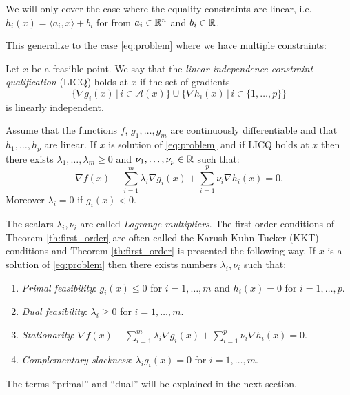 \documentclass[11pt,nocut]{article}
\begin{document}
We will only cover the case where the equality constraints are linear, i.e. $h_i(x) = \langle a_i, x \rangle + b_i$ for from $a_i \in \mathbb{R}^n$ and $b_i \in \mathbb{R}$.

This generalize to the case \eqref{eq:problem} where we have multiple constraints:

\begin{definition}[LICQ]
	Let $x$ be a feasible point. We say that the \emph{linear independence constraint qualification} (LICQ) holds at $x$ if the set of gradients
	$$
	\big\{ \nabla g_i(x) \, \big| \, i \in \mathcal{A}(x) \big\}
	\cup
	\big\{ \nabla h_i(x) \, \big| \, i \in \{1, \dots, p\} \big\}
	$$
	is linearly independent.
\end{definition}

\begin{theorem}\label{th:first_order}
	Assume that the functions $f$, $g_1, \dots, g_m$ are continuously differentiable and that $h_1, \dots, h_p$ are linear. If $x$ is solution of \eqref{eq:problem} and if LICQ holds at $x$
	then there exists $\lambda_1, \dots, \lambda_m \geq 0$ and $\nu_1, \dots, \nu_p \in \mathbb{R}$ such that:
	\begin{equation}\label{eq:kkt}
		\nabla f(x) + \sum_{i=1}^m \lambda_i \nabla g_i(x) + \sum_{i=1}^p \nu_i \nabla h_i(x) = 0.
	\end{equation}
	Moreover $\lambda_i = 0$ if $g_i(x) < 0$.
\end{theorem}

The scalars $\lambda_i, \nu_i$ are called \emph{Lagrange multipliers}.
The first-order conditions of Theorem \ref{th:first_order} are often called the Karush-Kuhn-Tucker (KKT) conditions and Theorem \ref{th:first_order} is presented the following way.
If $x$ is a solution of \eqref{eq:problem} then there exists numbers $\lambda_i,\nu_i$ such that:
\begin{enumerate}[label=(\roman*)]
	\item\label{item:kkt1} \emph{Primal feasibility}: $g_i(x) \leq 0$ for $i=1, \dots, m$ and $h_i(x) = 0$ for $i=1, \dots, p$.
	\item\label{item:kkt2} \emph{Dual feasibility}: $\lambda_i \geq 0$ for $i=1, \dots, m$.
	\item\label{item:kkt3} \emph{Stationarity}: $\nabla f(x) + \sum\limits_{i=1}^m \lambda_i \nabla g_i(x) + \sum\limits_{i=1}^p \nu_i \nabla h_i(x) = 0$.
	\item\label{item:kkt4} \emph{Complementary slackness}: $\lambda_i g_i(x) = 0$ for $i = 1 ,\dots, m$.
\end{enumerate}
The terms ``primal'' and ``dual'' will be explained in the next section.
\end{document}
